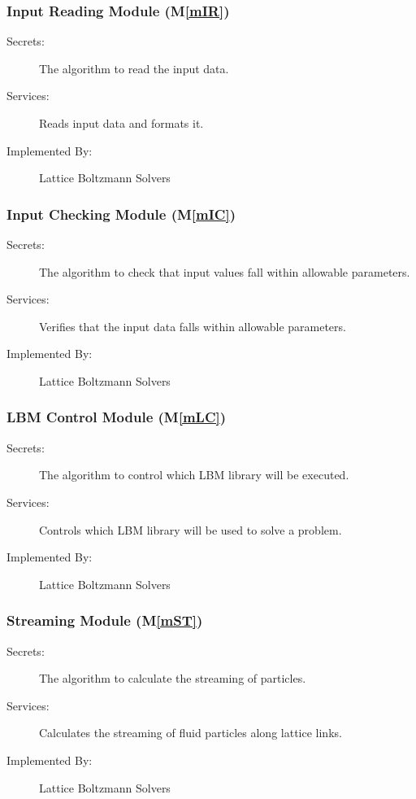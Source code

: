 \documentclass[12pt, titlepage]{article}
\newcommand{\mref}[1]{M\ref{#1}}
\newcommand{\famname}{Lattice Boltzmann Solvers} %
\begin{document}
\subsubsection{Input Reading Module (\mref{mIR})}

\begin{description}
	\item[Secrets:]The algorithm to read the input data.
	\item[Services:]Reads input data and formats it.
	\item[Implemented By:] \famname
\end{description}

\subsubsection{Input Checking Module (\mref{mIC})}

\begin{description}
	\item[Secrets:]The algorithm to check that input values fall within allowable parameters.
	\item[Services:]Verifies that the input data falls within allowable parameters.
	\item[Implemented By:] \famname
\end{description}

\subsubsection{LBM Control Module (\mref{mLC})}

\begin{description}
	\item[Secrets:]The algorithm to control which LBM library will be executed.
	\item[Services:]Controls which LBM library will be used to solve a problem.
	\item[Implemented By:] \famname
\end{description}

\subsubsection{Streaming Module (\mref{mST})}

\begin{description}
	\item[Secrets:]The algorithm to calculate the streaming of particles.
	\item[Services:]Calculates the streaming of fluid particles along lattice links.
	\item[Implemented By:] \famname
\end{description}
\end{document}
